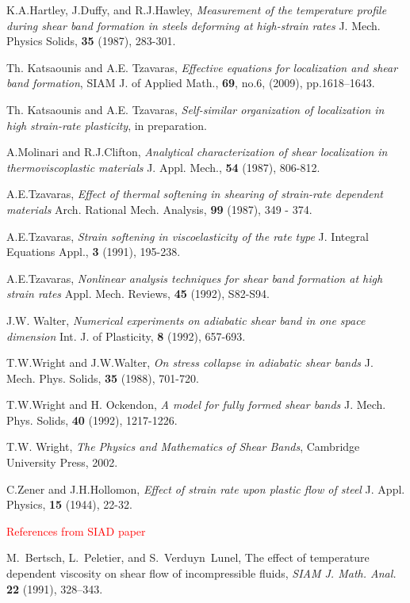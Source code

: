 \documentclass[a4paper,11pt]{article}
\newcommand{\tcr}{\textcolor{red}}
\theoremstyle{remark}
\begin{document}
\begin{thebibliography}{10}
{\sc K.A.Hartley, J.Duffy, and R.J.Hawley},
{\sl Measurement of the temperature profile during shear band formation in steels deforming at high-strain rates}
 J. Mech. Physics Solids, {\bf 35} (1987), 283-301.

{\sc Th. Katsaounis and A.E. Tzavaras}, {\sl Effective equations for localization and shear band formation},  SIAM J. of Applied Math., {\bf{69}}, no.6, (2009), pp.1618--1643.

{\sc Th. Katsaounis and A.E. Tzavaras}, {\sl Self-similar organization of localization in high strain-rate
plasticity}, in preparation.

{\sc A.Molinari and R.J.Clifton},
{\sl Analytical characterization of shear localization in thermoviscoplastic materials}
 J. Appl. Mech.,  {\bf 54} (1987), 806-812.

{\sc A.E.Tzavaras},
{\sl Effect of thermal softening in shearing of strain-rate dependent materials}
Arch. Rational Mech. Analysis, {\bf 99} (1987), 349 - 374.

{\sc A.E.Tzavaras},
{\sl Strain softening in viscoelasticity of the rate type}
J. Integral Equations Appl., {\bf 3} (1991), 195-238.

{\sc A.E.Tzavaras},
{\sl Nonlinear analysis techniques for shear band formation at high strain rates}
Appl. Mech. Reviews, {\bf 45} (1992), S82-S94.


{\sc  J.W. Walter},
{\sl Numerical experiments on adiabatic shear band in one space dimension}
Int. J. of Plasticity, {\bf 8} (1992), 657-693.

{\sc T.W.Wright and J.W.Walter},
{\sl On stress collapse in adiabatic shear bands}
J. Mech. Phys. Solids, {\bf 35} (1988), 701-720.

{\sc T.W.Wright and H. Ockendon},
{\sl A model for fully formed shear bands}
J. Mech. Phys. Solids, {\bf 40} (1992), 1217-1226.

{\sc T.W. Wright},
{\sl The Physics and Mathematics of Shear Bands},
Cambridge University Press, 2002.

{\sc  C.Zener and J.H.Hollomon},
{\sl Effect of strain rate upon plastic flow of steel}
J. Appl. Physics, {\bf 15} (1944), 22-32.

\tcr{ References from SIAD paper}

{\sc M.~Bertsch, L.~Peletier, and S.~Verduyn~Lunel},
The effect of temperature dependent viscosity on shear flow of  incompressible fluids,
{\it SIAM J. Math. Anal.} {\bf 22 } (1991), 328--343.


\end{thebibliography}
\end{document}
